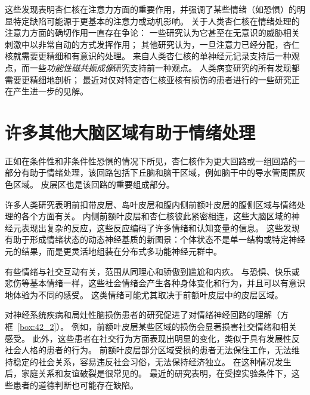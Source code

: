 这些发现表明杏仁核在注意力方面的重要作用，并强调了某些情绪（如恐惧）的明显特定缺陷可能源于更基本的注意力或动机影响。
关于人类杏仁核在情绪处理的注意力方面的确切作用一直存在争论：
一些研究认为它甚至在无意识的威胁相关刺激中以非常自动的方式发挥作用；
其他研究认为，一旦注意力已经分配，杏仁核就需要更精细和有意识的处理。
来自人类杏仁核的单神经元记录支持后一种观点，而一些\textit{功能性磁共振成像}研究支持前一种观点。
人类病变研究的所有发现都需要更精细地剖析；
最近对仅对特定杏仁核亚核有损伤的患者进行的一些研究正在产生进一步的见解。



\section{许多其他大脑区域有助于情绪处理}

正如在条件性和非条件性恐惧的情况下所见，杏仁核作为更大回路或一组回路的一部分有助于情绪处理，该回路包括下丘脑和脑干区域，例如脑干中的导水管周围灰色区域。
皮层区也是该回路的重要组成部分。


许多人类研究表明前扣带皮层、岛叶皮层和腹内侧前额叶皮层的腹侧区域与情绪处理的各个方面有关。
内侧前额叶皮层和杏仁核彼此紧密相连，这些大脑区域的神经元表现出复杂的反应，这些反应编码了许多情绪和认知变量的信息。
这些发现有助于形成情绪状态的动态神经基质的新图景：个体状态不是单一结构或特定神经元的结果，而是更灵活地组装在分布式多功能神经元群中。


有些情绪与社交互动有关，范围从同理心和骄傲到尴尬和内疚。
与恐惧、快乐或悲伤等基本情绪一样，这些社会情绪会产生各种身体变化和行为，并且可以有意识地体验为不同的感受。
这类情绪可能尤其取决于前额叶皮层中的皮层区域。


对神经系统疾病和局灶性脑损伤患者的研究促进了对情绪神经回路的理解（方框~\ref{box:42_2}）。
例如，前额叶皮层某些区域的损伤会显著损害社交情绪和相关感受。
此外，这些患者在社交行为方面表现出明显的变化，类似于具有发展性反社会人格的患者的行为。
前额叶皮层部分区域受损的患者无法保住工作，无法维持稳定的社会关系，容易违反社会习俗，无法保持经济独立。
在这种情况发生后，家庭关系和友谊破裂是很常见的。
最近的研究表明，在受控实验条件下，这些患者的道德判断也可能存在缺陷。


